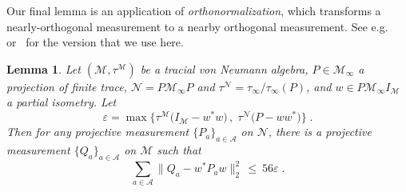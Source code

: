 \documentclass[11pt]{article}
\newtheorem{lemma}[theorem]{Lemma}
\theoremstyle{definition}
\newcommand{\Id}{\ensuremath{I}}
\newcommand{\mA}{\ensuremath{\mathcal{A}}}
\newcommand{\mM}{\ensuremath{\mathcal{M}}}
\newcommand{\eps}{\varepsilon}
\newcommand{\mN}{\mathcal{N}}
\begin{document}
Our final lemma is an application of \emph{orthonormalization}, which transforms a nearly-orthogonal measurement to a nearby orthogonal measurement. See e.g.~\cite{kempe2011parallel,ji2020quantum} or~\cite[Theorem 1.2]{de2021orthogonalization} for the version that we use here. 
	
\begin{lemma}\label{lem:pull-back}
Let  $(\mM,\tau^\mM)$ be a tracial von Neumann algebra, $P\in\mM_\infty$ a projection of finite trace, $\mN=P\mM_\infty P$ and $\tau^\mN=\tau_\infty/\tau_\infty(P)$, and $w\in P \mM_\infty \Id_\mM$ a partial isometry. Let 
\[ \eps = \max\big\{ \tau^\mM\big(\Id_\mM - w^* w\big)\,,\;\tau^\mN\big( P- w w^*\big)\big\}\;.\] 
 Then for any projective measurement $\{P_a\}_{a \in \mA}$ on $\mN$, there is a projective measurement $\{Q_a\}_{a \in \mA}$ on $\mM$ such that 
\begin{equation}
\label{eq:pull-back} \sum_{a \in \mA} \big\| Q_a - w^* P_a w\big\|_2^2 \,\leq \ 56\eps\;.
\end{equation}
\end{lemma}	
\end{document}

